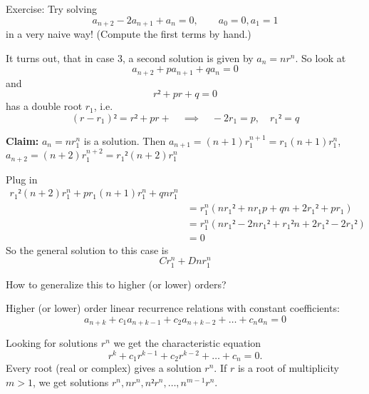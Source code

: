 \documentclass[english]{lbscript}
\begin{document}
\begin{example}{}{}
	Exercise: Try solving
	\begin{equation}
		\label{eq:73}
		a_{n+2}-2a_{n+1} + a_{n} = 0, \quad \quad a_0=0, a_1=1
	\end{equation}
	in a very naive way! (Compute the first terms by hand.)
\end{example}

It turns out, that in case 3, a second solution is given by \(a_n=n r^{n}\). So look at
\begin{equation}
	\label{eq:74}
	a_{n+2} + p a_{n+1} + q a_n = 0
\end{equation}
and
\begin{equation}
	\label{eq:75}
	r²+pr+q=0
\end{equation}
has a double root \(r_1\), i.e.
\begin{equation}
	\label{eq:76}
	(r-r_1)² = r²+pr+\quad ⟹\quad -2r_1=p, \quad r_1²=q
\end{equation}

\textbf{Claim:} \(a_n=n r_1^{n}\) is a solution. Then \(a_{n+1}=(n+1)r_1^{n+1}= r_1 (n+1)r_1^{n}\), \(a_{n+2}=(n+2)r_1^{n+2}= r_1²(n+2)r_1^{n}\)

Plug in
\begin{align}
	\label{eq:77}
	r_1²(n+2)r_1^{n}+p r_1(n+1) r_1^{n} + qn r_1^{n}               \\
	 & = r_1^{n}\left(n r_1² + n r_1p + qn + 2r_1² + p r_1 \right) \\
	 & = r_1^{n}\left(n r_1² - 2n r_1² + r_1²n+2r_1²-2r_1² \right) \\
	 & = 0
\end{align}
So the general solution to this case is
\begin{equation}
	\label{eq:78}
	C r_1^{n}+D n r_1^{n}
\end{equation}

How to generalize this to higher (or lower) orders?

Higher (or lower) order linear recurrence relations with constant coefficients:
\begin{equation}
	\label{eq:79}
	a_{n+k} + c_1 a_{n+k-1} + c_2 a_{n+k-2}+\dots+c_n a_n = 0
\end{equation}

Looking for solutions \(r^{n}\) we get the characteristic equation
\begin{equation}
	\label{eq:80}
	r^{k} + c_1 r^{k-1} + c_2 r^{k-2}+\dots + c_n = 0.
\end{equation}
Every root (real or complex) gives a solution \(r^{n}\). If \(r\) is a root of multiplicity \(m>1\), we get solutions \(r^{n}, n r^{n}, n² r^{n}, \dots, n^{m-1} r^{n}\).
\end{document}

